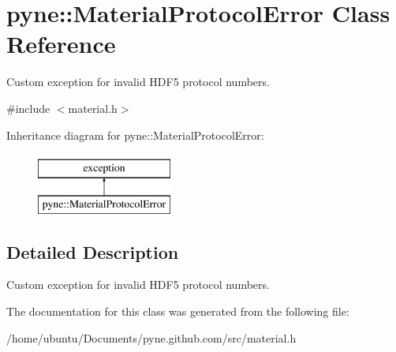 \hypertarget{classpyne_1_1_material_protocol_error}{}\section{pyne\+:\+:Material\+Protocol\+Error Class Reference}
\label{classpyne_1_1_material_protocol_error}


Custom exception for invalid H\+D\+F5 protocol numbers.  




{\ttfamily \#include $<$material.\+h$>$}

Inheritance diagram for pyne\+:\+:Material\+Protocol\+Error\+:\begin{figure}[H]
\begin{center}
\leavevmode
\includegraphics[height=2.000000cm]{classpyne_1_1_material_protocol_error}
\end{center}
\end{figure}


\subsection{Detailed Description}
Custom exception for invalid H\+D\+F5 protocol numbers. 

The documentation for this class was generated from the following file\+:\begin{DoxyCompactItemize}
\item 
/home/ubuntu/\+Documents/pyne.\+github.\+com/src/material.\+h\end{DoxyCompactItemize}
